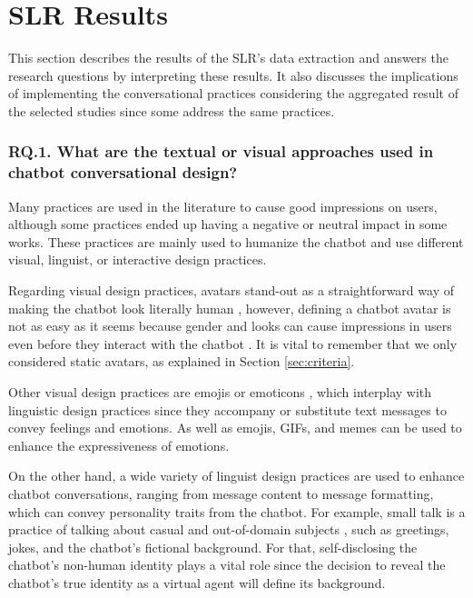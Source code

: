 \section{SLR Results}

This section describes the results of the SLR's data extraction and answers the research questions by interpreting these results. It also discusses the implications of implementing the conversational practices considering the aggregated result of the selected studies since some address the same practices.


\subsubsection{RQ.1. What are the textual or visual approaches used in chatbot conversational design?}

Many practices are used in the literature to cause good impressions on users, although some practices ended up having a negative or neutral impact in some works. These practices are mainly used to humanize the chatbot and use different visual, linguist, or interactive design practices. 

Regarding visual design practices, avatars stand-out as a straightforward way of making the chatbot look literally human , however, defining a chatbot avatar is not as easy as it seems because gender and looks can cause impressions in users even before they interact with the chatbot . It is vital to remember that we only considered static avatars, as explained in Section \ref{sec:criteria}.

Other visual design practices are emojis or emoticons , which interplay with linguistic design practices since they accompany or substitute text messages to convey feelings and emotions. As well as emojis, GIFs, and memes  can be used to enhance the expressiveness of emotions.

On the other hand, a wide variety of linguist design practices are used to enhance chatbot conversations, ranging from message content to message formatting, which can convey personality traits from the chatbot. For example, small talk is a practice of talking about casual and out-of-domain subjects , such as greetings, jokes, and the chatbot's fictional background. For that, self-disclosing the chatbot's non-human identity plays a vital role since the decision to reveal the chatbot's true identity as a virtual agent  will define its background. 

